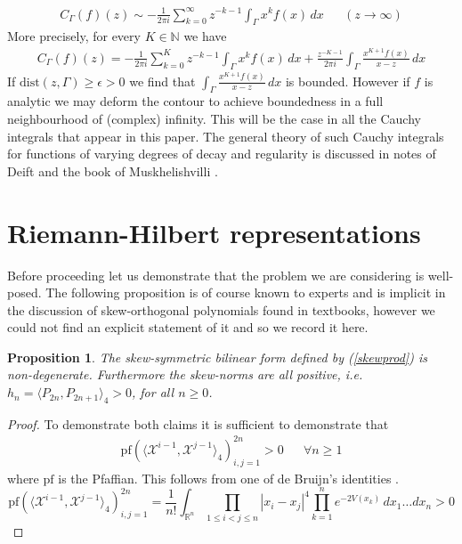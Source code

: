 \documentclass[12pt]{article}
\newtheorem{proposition}[theorem]{Proposition}
\theoremstyle{definition}
\begin{document}
\begin{enumerate}
\begin{align*}
C_\Gamma (f)(z) \sim - \frac{1}{2\pi i} \sum_{k=0}^\infty z^{-k-1} \int_\Gamma x^k f(x) \, dx & & (z \to \infty)
\end{align*}
More precisely, for every $K \in \mathbb{N}$ we have
\begin{align*}
C_\Gamma (f)(z) =  - \frac{1}{2\pi i} \sum_{k=0}^K z^{-k-1} \int_\Gamma x^k f(x) \, dx +\frac{z^{-K-1}}{2\pi i }  \int_\Gamma \frac{ x^{K+1}  f(x)}{x-z} \, dx 
\end{align*}
If $\mathrm{dist}(z,\Gamma) \geq \epsilon > 0$ we find that $\int_\Gamma \frac{ x^{K+1}  f(x)}{x-z} \, dx$ is bounded. However if $f$ is analytic we may deform the contour to achieve boundedness in a full neighbourhood of (complex) infinity. This will be the case in all the Cauchy integrals that appear in this paper. The general theory of such Cauchy integrals for functions of varying degrees of decay and regularity is discussed in notes of Deift \cite{deift2019riemannhilbert} and the book of Muskhelishvilli \cite{singular}.
\end{enumerate}
\newpage
\section{Riemann-Hilbert representations}\label{rhpsection}

Before proceeding let us demonstrate that the problem we are considering is well-posed. The following proposition is of course known to experts and is implicit in the discussion of skew-orthogonal polynomials found in textbooks, however we could not find an explicit statement of it and so we record it here.
\begin{proposition} The skew-symmetric bilinear form defined by (\ref{skewprod}) is non-degenerate. Furthermore the skew-norms are all positive, i.e. $h_n = \langle P_{2n}, P_{2n+1} \rangle_4 > 0$, for all $n \geq 0$.
\end{proposition}
\begin{proof}
To demonstrate both claims it is sufficient to demonstrate that
\begin{align*}
\mathrm{pf} \left( \langle \mathscr{X}^{i-1}, \mathscr{X}^{j-1} \rangle_4 \right)_{i,j=1}^{2n} > 0 & & \forall n \geq 1
\end{align*}
where $\mathrm{pf}$ is the Pfaffian.  This follows from one of de Bruijn's identities \cite{debruijn}.
$$\mathrm{pf} \left( \langle \mathscr{X}^{i-1}, \mathscr{X}^{j-1} \rangle_4 \right)_{i,j=1}^{2n} = \frac{1}{n!} \int_{\mathbb{R}^n} \prod_{1 \leq i < j \leq n} |x_i - x_j|^4 \prod_{k=1}^n e^{-2V(x_k)} \, d x_1 \dots d x_n  > 0 $$
\end{proof}
\end{document}
